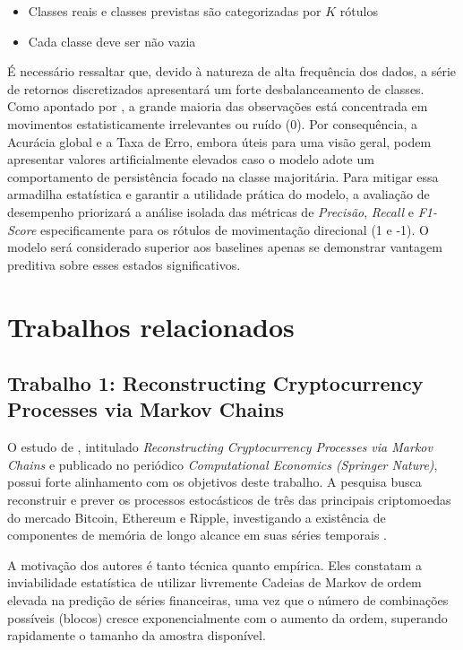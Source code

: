 \documentclass[
    12pt,                %
    openright,           %
    oneside,             %
    a4paper,             %
    english,             %
    brazil               %
]{abntex2}
\begin{document}
\begin{itemize}
    \item Classes reais e classes previstas são categorizadas por $K$ rótulos
    \item Cada classe deve ser não vazia
\end{itemize}

É necessário ressaltar que, devido à natureza de alta frequência dos dados, a série de retornos discretizados 
apresentará um forte desbalanceamento de classes. Como apontado por , a grande maioria das observações está concentrada em movimentos
estatisticamente irrelevantes ou ruído (0). Por consequência, a Acurácia global e a Taxa de Erro, embora úteis para uma visão geral, 
podem apresentar valores artificialmente elevados caso o modelo adote um comportamento de persistência focado na classe majoritária. 
Para mitigar essa armadilha estatística e garantir a utilidade prática do modelo, a avaliação de desempenho priorizará a análise isolada das métricas de 
\textit{Precisão}, \textit{Recall} e \textit{F1-Score} especificamente para os rótulos de movimentação direcional (1 e -1). 
O modelo será considerado superior aos baselines apenas se demonstrar vantagem preditiva sobre esses estados significativos.

\section{Trabalhos relacionados}
\label{sec:trabalhos_relacionados}

\subsection{Trabalho 1: Reconstructing Cryptocurrency Processes via Markov Chains}
\label{sec:trabalho1_araujo}

O estudo de , intitulado \textit{Reconstructing Cryptocurrency Processes via Markov Chains} e publicado no periódico \textit{Computational Economics 
(Springer Nature)}, possui forte alinhamento com os objetivos deste trabalho. A pesquisa busca reconstruir e prever os processos estocásticos de três das principais 
criptomoedas do mercado Bitcoin, Ethereum e Ripple, investigando a existência de componentes de memória de longo alcance em suas séries temporais \cite{ARAUJO}.

A motivação dos autores é tanto técnica quanto empírica. Eles constatam a inviabilidade estatística de utilizar livremente Cadeias de Markov de ordem elevada na 
predição de séries financeiras, uma vez que o número de combinações possíveis (blocos) cresce exponencialmente com o aumento da ordem, superando rapidamente o tamanho 
da amostra disponível.
\end{document}
